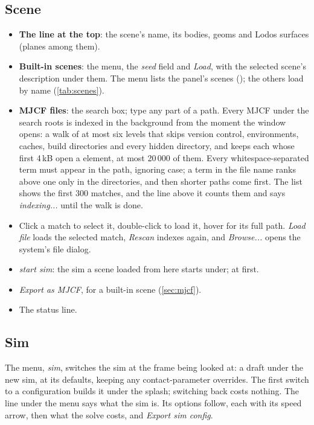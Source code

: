 \subsection{Scene}\label{sec:scenepanel}

\begin{itemize}
\item \textbf{The line at the top}: the scene's name, its bodies, geoms and Lodos surfaces (planes among them).
\item \textbf{Built-in scenes}: the menu, the \emph{seed} field and \emph{Load}, with the selected scene's description under them. The menu lists the panel's scenes (); the others load by name (\cref{tab:scenes}).
\item \textbf{MJCF files}: the search box; type any part of a path. Every MJCF under the search roots is indexed in the background from the moment the window opens: a walk of at most six levels that skips version control, environments, caches, build directories and every hidden directory, and keeps each  whose first 4\,kB open a  element, at most 20\,000 of them. Every whitespace-separated term must appear in the path, ignoring case; a term in the file name ranks above one only in the directories, and then shorter paths come first. The list shows the first 300 matches, and the line above it counts them and says \emph{indexing...} until the walk is done.
\item Click a match to select it, double-click to load it, hover for its full path. \emph{Load file} loads the selected match, \emph{Rescan} indexes again, and \emph{Browse...} opens the system's file dialog.
\item \emph{start sim}: the sim a scene loaded from here starts under;  at first.
\item \emph{Export as MJCF}, for a built-in scene (\cref{sec:mjcf}).
\item The status line.
\end{itemize}

\subsection{Sim}\label{sec:simpanel}

The menu, \emph{sim}, switches the sim at the frame being looked at: a draft under the new sim, at its defaults, keeping any contact-parameter overrides. The first switch to a configuration builds it under the splash; switching back costs nothing. The line under the menu says what the sim is. Its options follow, each with its speed arrow, then what the solve costs, and \emph{Export sim config}.

